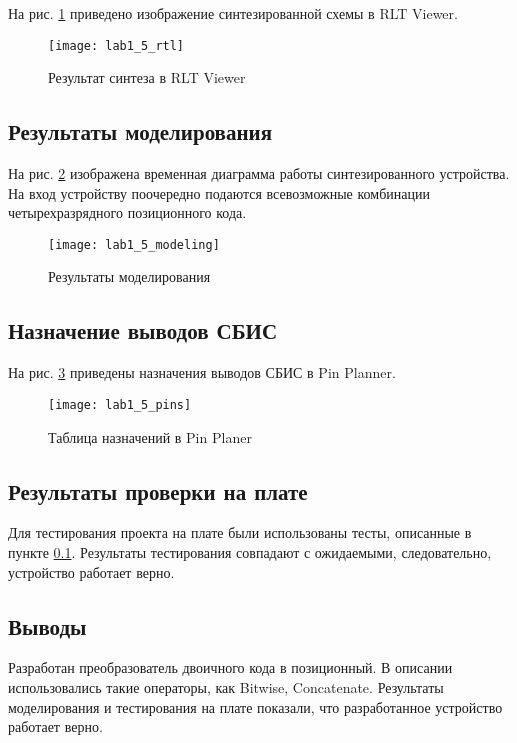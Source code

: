 На рис. \ref{fig:lab1_5_rtl} приведено изображение синтезированной схемы в RLT Viewer.

\begin{figure}[H]
\begin{center}
	\texttt{[image: lab1\_5\_rtl]}
	\caption{Результат синтеза в RLT Viewer}
	\label{fig:lab1_5_rtl}
\end{center}
\end{figure}

\subsection{Результаты моделирования}
\label{sec:lab1_5_modeling}

На рис. \ref{fig:lab1_5_modeling} изображена временная диаграмма работы синтезированного устройства. На вход устройству поочередно подаются всевозможные комбинации четырехразрядного позиционного кода.
\begin{figure}[H]
\begin{center}
	\texttt{[image: lab1\_5\_modeling]}
	\caption{Результаты моделирования}
	\label{fig:lab1_5_modeling}
\end{center}
\end{figure}

\subsection{Назначение выводов СБИС}

На рис. \ref{fig:lab1_5_pins} приведены назначения выводов СБИС в Pin Planner.

\begin{figure}[H]
\begin{center}
	\texttt{[image: lab1\_5\_pins]}
	\caption{Таблица назначений в Pin Planer}
	\label{fig:lab1_5_pins}
\end{center}
\end{figure}

\subsection{Результаты проверки на плате}

Для тестирования проекта на плате были использованы тесты, описанные в пункте \ref{sec:lab1_5_modeling}. Результаты тестирования совпадают с ожидаемыми, следовательно, устройство работает верно.

\subsection{Выводы}

Разработан преобразователь двоичного кода в позиционный. В описании использовались такие операторы, как Bitwise, Concatenate. Результаты моделирования и тестирования на плате показали, что разработанное устройство работает верно.

